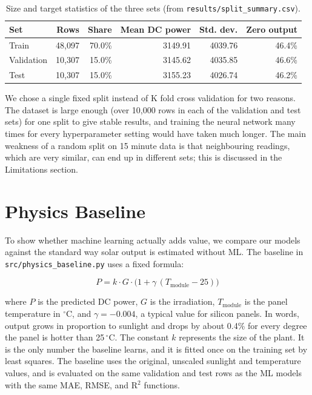 \begin{table}[h]
\centering
\begin{tabular}{lrrrrr}
\hline
\textbf{Set} & \textbf{Rows} & \textbf{Share} & \textbf{Mean DC power} & \textbf{Std. dev.} & \textbf{Zero output} \\
\hline
Train      & 48,097 & 70.0\% & 3149.91 & 4039.76 & 46.4\% \\
Validation & 10,307 & 15.0\% & 3145.62 & 4035.85 & 46.6\% \\
Test       & 10,307 & 15.0\% & 3155.23 & 4026.74 & 46.2\% \\
\hline
\end{tabular}
\caption{Size and target statistics of the three sets (from \texttt{results/split\_summary.csv}).}
\label{tab:split}
\end{table}

We chose a single fixed split instead of K fold cross validation for two reasons. The dataset is large enough (over 10,000 rows in each of the validation and test sets) for one split to give stable results, and training the neural network many times for every hyperparameter setting would have taken much longer. The main weakness of a random split on 15 minute data is that neighbouring readings, which are very similar, can end up in different sets; this is discussed in the Limitations section.

\section{Physics Baseline}

To show whether machine learning actually adds value, we compare our models against the standard way solar output is estimated without ML. The baseline in \texttt{src/physics\_baseline.py} uses a fixed formula:

\begin{equation}
P = k \cdot G \cdot \bigl(1 + \gamma\,(T_{\text{module}} - 25)\bigr)
\end{equation}

where $P$ is the predicted DC power, $G$ is the irradiation, $T_{\text{module}}$ is the panel temperature in $^{\circ}$C, and $\gamma = -0.004$, a typical value for silicon panels. In words, output grows in proportion to sunlight and drops by about 0.4\% for every degree the panel is hotter than 25\,$^{\circ}$C. The constant $k$ represents the size of the plant. It is the only number the baseline learns, and it is fitted once on the training set by least squares. The baseline uses the original, unscaled sunlight and temperature values, and is evaluated on the same validation and test rows as the ML models with the same MAE, RMSE, and R$^2$ functions.

